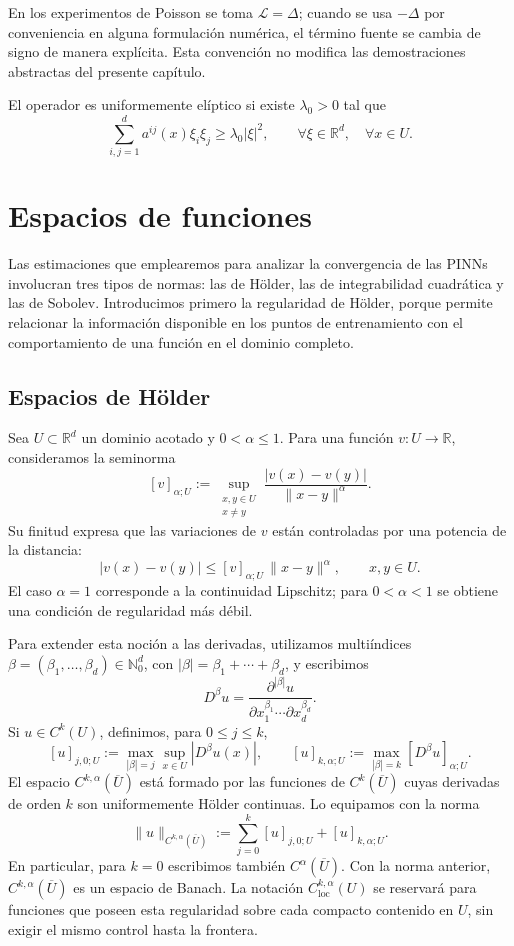 En los experimentos de Poisson se toma $\mathcal L=\Delta$; cuando se usa
$-\Delta$ por conveniencia en alguna formulación numérica, el término
fuente se cambia de signo de manera explícita. Esta convención no modifica
las demostraciones abstractas del presente capítulo.

El operador es uniformemente elíptico si existe $\lambda_0>0$ tal que
\[
\sum_{i,j=1}^{d}a^{ij}(x)\xi_i\xi_j
\geq
\lambda_0|\xi|^2,
\qquad
\forall\xi\in\mathbb{R}^d,\quad \forall x\in U.
\]

\section{Espacios de funciones}

Las estimaciones que emplearemos para analizar la convergencia de las PINNs
involucran tres tipos de normas: las de H\"older, las de integrabilidad
cuadr\'atica y las de Sobolev. Introducimos primero la regularidad de H\"older,
porque permite relacionar la informaci\'on disponible en los puntos de
entrenamiento con el comportamiento de una funci\'on en el dominio completo.

\subsection*{Espacios de H\"older}

Sea $U\subset\mathbb R^d$ un dominio acotado y $0<\alpha\leq 1$. Para una
funci\'on $v:U\to\mathbb R$, consideramos la seminorma
\[
[v]_{\alpha;U}
:=\sup_{\substack{x,y\in U\\x\neq y}}
\frac{|v(x)-v(y)|}{\|x-y\|^\alpha}.
\]
Su finitud expresa que las variaciones de $v$ est\'an controladas por una
potencia de la distancia:
\[
|v(x)-v(y)|\leq[v]_{\alpha;U}\,\|x-y\|^\alpha,
\qquad x,y\in U.
\]
El caso $\alpha=1$ corresponde a la continuidad Lipschitz; para
$0<\alpha<1$ se obtiene una condici\'on de regularidad m\'as d\'ebil.

Para extender esta noci\'on a las derivadas, utilizamos multi\'indices
$\beta=(\beta_1,\ldots,\beta_d)\in\mathbb N_0^d$, con
$|\beta|=\beta_1+\cdots+\beta_d$, y escribimos
\[
D^\beta u
=\frac{\partial^{|\beta|}u}
{\partial x_1^{\beta_1}\cdots\partial x_d^{\beta_d}}.
\]
Si $u\in C^k(U)$, definimos, para $0\leq j\leq k$,
\[
[u]_{j,0;U}:=
\max_{|\beta|=j}\sup_{x\in U}|D^\beta u(x)|,
\qquad
[u]_{k,\alpha;U}:=
\max_{|\beta|=k}[D^\beta u]_{\alpha;U}.
\]
El espacio $C^{k,\alpha}(\overline U)$ est\'a formado por las funciones de
$C^k(\overline U)$ cuyas derivadas de orden $k$ son uniformemente
H\"older continuas. Lo equipamos con la norma
\[
\|u\|_{C^{k,\alpha}(\overline U)}
:=\sum_{j=0}^{k}[u]_{j,0;U}+[u]_{k,\alpha;U}.
\]
En particular, para $k=0$ escribimos tambi\'en $C^\alpha(\overline U)$.
Con la norma anterior, $C^{k,\alpha}(\overline U)$ es un espacio de
Banach. La notaci\'on $C^{k,\alpha}_{\mathrm{loc}}(U)$ se reservar\'a
para funciones que poseen esta regularidad sobre cada compacto contenido
en $U$, sin exigir el mismo control hasta la frontera.

